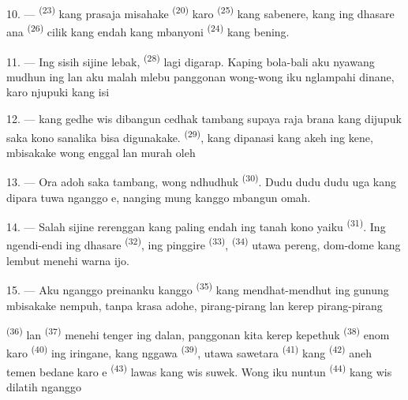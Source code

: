 10. ---  \textsuperscript{(23)} kang prasaja misahake
 \textsuperscript{(20)} karo 
\textsuperscript{(25)} kang sabenere, kang ing dhasare ana
 \textsuperscript{(26)} cilik kang endah kang mbanyoni
 \textsuperscript{(24)} kang bening.

11. --- Ing sisih sijine lebak, 
\textsuperscript{(28)} lagi digarap. Kaping bola-bali aku nyawang
 mudhun ing  lan aku malah
mlebu  panggonan wong-wong iku nglampahi dinane, karo
njupuki  kang isi 

12. ---  kang gedhe wis dibangun cedhak
tambang supaya raja brana kang dijupuk saka kono sanalika bisa
digunakake.  \textsuperscript{(29)}, kang
dipanasi  kang akeh ing kene, mbisakake wong enggal
lan murah oleh 

13. --- Ora adoh saka tambang, wong ndhudhuk 
\textsuperscript{(30)}. Dudu  dudu 
dudu uga  kang dipara 
tuwa nganggo e, nanging mung 
kanggo mbangun omah.

14. --- Salah sijine rerenggan kang paling endah ing tanah kono yaiku
 \textsuperscript{(31)}. Ing ngendi-endi ing dhasare
 \textsuperscript{(32)}, ing pinggire  \textsuperscript{(33)}, 
\textsuperscript{(34)} utawa pereng, dom-dome kang lembut menehi warna
ijo.

\VUsaut{3.0mm}
\VUsaut{3.0mm}

15. --- Aku nganggo preinanku kanggo 
 \textsuperscript{(35)} kang mendhat-mendhut ing gunung
mbisakake nempuh, tanpa krasa adohe, pirang-pirang 
lan kerep pirang-pirang 

 \textsuperscript{(36)} lan 
\textsuperscript{(37)} menehi tenger ing dalan, panggonan kita kerep
kepethuk  \textsuperscript{(38)} enom karo
 \textsuperscript{(40)} ing iringane, kang nggawa
 \textsuperscript{(39)}, utawa sawetara  \textsuperscript{(41)} kang 
\textsuperscript{(42)} aneh temen bedane karo e
\textsuperscript{(43)} lawas kang wis suwek. Wong iku nuntun
 \textsuperscript{(44)} kang wis dilatih nganggo

